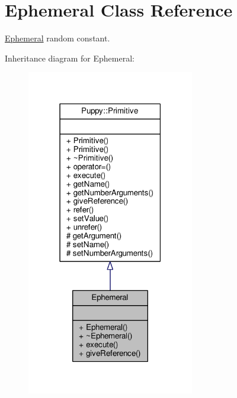 \hypertarget{classEphemeral}{}\section{Ephemeral Class Reference}
\label{classEphemeral}


\hyperlink{classEphemeral}{Ephemeral} random constant.  




Inheritance diagram for Ephemeral\+:
\nopagebreak
\begin{figure}[H]
\begin{center}
\leavevmode
\includegraphics[width=207pt]{classEphemeral__inherit__graph}
\end{center}
\end{figure}



